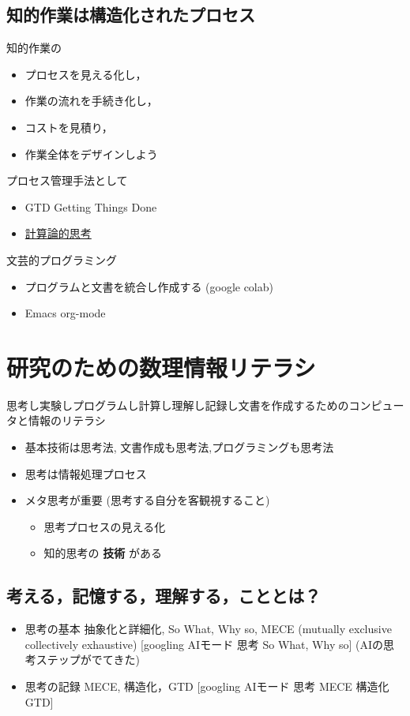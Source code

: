 \documentclass[dvipdfmx,11pat]{jarticle}
\begin{document}
\subsection{知的作業は構造化されたプロセス}
\label{sec:org6371429}
知的作業の
\begin{itemize}
\item プロセスを見える化し，
\item 作業の流れを手続き化し，
\item コストを見積り，
\item 作業全体をデザインしよう
\end{itemize}

プロセス管理手法として
\begin{itemize}
\item GTD Getting Things Done
\item \href{./comp\_tinking.org}{計算論的思考}
\end{itemize}


文芸的プログラミング
\begin{itemize}
\item プログラムと文書を統合し作成する (google colab)
\item Emacs org-mode
\end{itemize}
\section{研究のための数理情報リテラシ}
\label{sec:org84d29c2}

思考し実験しプログラムし計算し理解し記録し文書を作成するためのコンピュー
タと情報のリテラシ

\begin{itemize}
\item 基本技術は思考法, 文書作成も思考法,プログラミングも思考法
\item 思考は情報処理プロセス
\item メタ思考が重要 (思考する自分を客観視すること)
\begin{itemize}
\item 思考プロセスの見える化
\item 知的思考の \textbf{技術} がある
\end{itemize}
\end{itemize}
\subsection{考える，記憶する，理解する，こととは？}
\label{sec:org6f0d542}

\begin{itemize}
\item 思考の基本 抽象化と詳細化, So What, Why so, MECE (mutually
exclusive collectively exhaustive)
{[}googling AIモード 思考 So What, Why so] (AIの思考ステップがでてきた)
\item 思考の記録 MECE, 構造化，GTD
{[}googling AIモード 思考 MECE 構造化 GTD]
\end{itemize}
\end{document}
